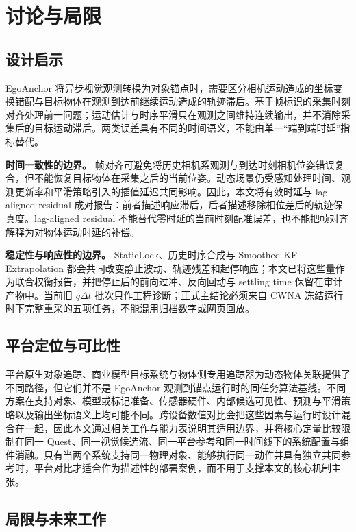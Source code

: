 \documentclass[review]{vgtc}
\begin{document}
\section{讨论与局限}\label{sec:discussion}


\subsection{设计启示}


EgoAnchor 将异步视觉观测转换为对象锚点时，需要区分相机运动造成的坐标变换错配与目标物体在观测到达前继续运动造成的轨迹滞后。基于帧标识的采集时刻对齐处理前一问题；运动估计与时序平滑只在观测之间维持连续输出，并不消除采集后的目标运动滞后。两类误差具有不同的时间语义，不能由单一“端到端时延”指标替代。

\textbf{时间一致性的边界。} 帧对齐可避免将历史相机系观测与到达时刻相机位姿错误复合，但不能恢复目标物体在采集之后的当前位姿。动态场景仍受感知处理时间、观测更新率和平滑策略引入的插值延迟共同影响。因此，本文将有效时延与 lag-aligned residual 成对报告：前者描述响应滞后，后者描述移除相位差后的轨迹保真度。lag-aligned residual 不能替代零时延的当前时刻配准误差，也不能把帧对齐解释为对物体运动时延的补偿。

\textbf{稳定性与响应性的边界。} StaticLock、历史时序合成与 Smoothed KF Extrapolation 都会共同改变静止波动、轨迹残差和起停响应；本文已将这些量作为联合权衡报告，并把停止后的前向过冲、反向回动与 settling time 保留在审计产物中。当前旧 $q\Delta t$ 批次只作工程诊断；正式主结论必须来自 CWNA 冻结运行时下完整重采的五项任务，不能混用归档数字或网页回放。

\subsection{平台定位与可比性}

平台原生对象追踪、商业模型目标系统与物体侧专用追踪器为动态物体关联提供了不同路径，但它们并不是 EgoAnchor 观测到锚点运行时的同任务算法基线。不同方案在支持对象、模型或标记准备、传感器硬件、内部候选可见性、预测与平滑策略以及输出坐标语义上均可能不同。跨设备数值对比会把这些因素与运行时设计混合在一起，因此本文通过相关工作与能力表说明其适用边界，并将核心定量比较限制在同一 Quest、同一视觉候选流、同一平台参考和同一时间线下的系统配置与组件消融。只有当两个系统支持同一物理对象、能够执行同一动作并具有独立共同参考时，平台对比才适合作为描述性的部署案例，而不用于支撑本文的核心机制主张。

\subsection{局限与未来工作}
\end{document}
